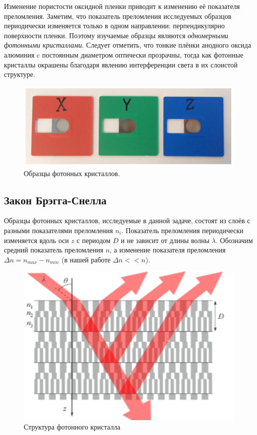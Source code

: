 \documentclass[a4paper, 12pt]{article}
\begin{document}
Изменение пористости оксидной пленки приводит к изменению её показателя преломления. Заметим, что показатель преломления исследуемых образцов периодически изменяется только в одном направлении: перпендикулярно поверхности пленки. Поэтому изучаемые образцы являются \textit{одномерными фотонными кристаллами}. Следует отметить, что тонкие плёнки анодного оксида алюминия c постоянным диаметром оптически прозрачны, тогда как фотонные кристаллы окрашены благодаря явлению интерференции света в их слоистой структуре.

\begin{figure}[H]
	\centering
	\includegraphics[scale=0.7]{4}
	\caption{Образцы фотонных кристаллов.}
	\label{im:4}
\end{figure}

\subsection{Закон Брэгга-Снелла}

Образцы фотонных кристаллов, исследуемые в данной задаче, состоят из слоёв с разными показателями преломления $n_i$. Показатель преломления периодически изменяется вдоль оси $z$ с периодом $D$ и не зависит от длины волны $\lambda$. Обозначим средний показатель преломления $n$, а изменение показателя преломления $\Delta n= n_{max}-n_{min}$ (в нашей работе $\Delta n<<n$).


\begin{figure}[H]
	\centering
	\includegraphics[scale=0.8]{2}
	\caption{Структура фотонного кристалла}
	\label{im:2}
\end{figure}
\end{document}
